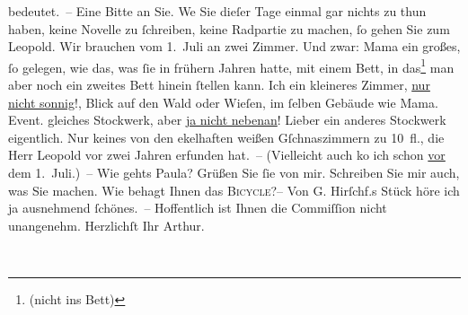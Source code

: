 \begin{ledgroupsized}[t]{13cm}
               bedeutet. – Eine Bitte an Sie. We{\geminationn} Sie dieſer Tage
               einmal gar nichts zu thun haben, keine Novelle zu ſchreiben, keine Radpartie zu
               machen, ſo gehen Sie zum Leopold. Wir brauchen vom 1. Juli an zwei Zimmer. Und zwar: Mama ein großes, ſo gelegen, wie das, was ſie in frühern
               Jahren hatte, mit einem Bett, in das\footnote{\noindent{}(nicht ins Bett)} man aber noch ein zweites Bett hinein ſtellen kann. Ich ein kleineres
               Zimmer, \uline{nur nicht sonnig}!, Blick auf den Wald oder
               Wieſen, im ſelben Gebäude wie Mama. Event. gleiches Stockwerk, aber \uline{ja nicht
                  nebenan}! Lieber ein anderes Stockwerk eigentlich. Nur keines von den
               ekelhaften weißen Gſchnaszimmern zu 10 fl., die Herr Leopold vor {\pb}zwei Jahren erfunden hat. –
               (Vielleicht auch ko{\geminationm} ich schon \uline{vor} dem 1. Juli.) –\pend
           \pstart
           Wie gehts Paula? Grüßen Sie ſie von mir.\pend
           \pstart
           Schreiben Sie mir auch, was Sie machen. Wie behagt Ihnen das \textsc{Bicycle}?–\pend
           \pstart
           Von G. Hirſchf.s Stück höre ich ja ausnehmend ſchönes. –\pend
           \pstart
           Hoffentlich ist Ihnen die Commiſſion nicht unangenehm.\pend
           \pstart Herzlichſt Ihr \spacefill\mbox{Arthur.}\pend{}
         
         \endnumbering{}\end{ledgroupsized}  \newcommand{\dateiname}{L00682}\newcommand{\titel}{Arthur Schnitzler an Richard Beer-Hofmann, 5. 6. 1897}\newcommand{\editorInnen}{Martin Anton Müller und Gerd-Hermann Susen}
      